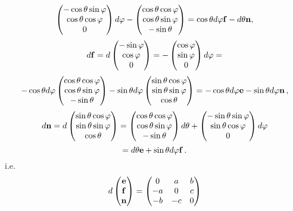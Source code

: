 \documentclass[12pt]{article}
\theoremstyle{theorem}
\numberwithin{equation}{section}
\begin{document}
{$$           $$
           $$
\begin{pmatrix}
        -\cos\theta\sin\varphi\cr
        \cos\theta\cos\varphi\cr
           0\cr
   \end{pmatrix}d\varphi-\begin{pmatrix}
        \cos\theta\cos\varphi\cr
        \cos\theta\sin\varphi\cr
        -\sin\theta\cr
   \end{pmatrix}=\cos\theta d\varphi {\bf f}-d\theta {\bf n},
            $$
             $$
            d{\bf f}=d
            \begin{pmatrix}
        -\sin\varphi\cr
        \cos\varphi\cr
          0\cr
   \end{pmatrix}=
              -
   \begin{pmatrix}
        \cos\varphi\cr
        \sin\varphi\cr
          0\cr
   \end{pmatrix}d\varphi=
            $$
            $$
       -\cos\theta d\varphi \begin{pmatrix}
        \cos\theta\cos\varphi\cr
        \cos\theta\sin\varphi\cr
        -\sin\theta\cr
   \end{pmatrix}-\sin\theta d\varphi
   \begin{pmatrix}
    \sin\theta\cos\varphi\cr
     \sin\theta\sin\varphi\cr
      \cos\theta\cr
   \end{pmatrix}=
   -\cos\theta d\varphi {\bf e}-\sin\theta d\varphi {\bf n}\,,
            $$
             $$
             d{\bf n}=
   d\begin{pmatrix}
    \sin\theta\cos\varphi\cr
     \sin\theta\sin\varphi\cr
      \cos\theta\cr
   \end{pmatrix}=
   \begin{pmatrix}
    \cos\theta\cos\varphi\cr
     \cos\theta\sin\varphi\cr
      -\sin\theta\cr
   \end{pmatrix}d\theta+
   \begin{pmatrix}
    -\sin\theta\sin\varphi\cr
     \sin\theta\cos\varphi\cr
        0\cr
   \end{pmatrix}d\varphi
        $$
        $$
   =d\theta {\bf e}+\sin\theta d\varphi {\bf f}\,.
        $$
   i.e.
   \begin{equation}\label{derivationformulaefor cylinder}
                    d\begin{pmatrix}
                    \e\cr\f\cr\n\cr
                    \end{pmatrix}=
                    \begin{pmatrix}
                    0&a&b\cr -a&0&c\cr -b&-c&0\cr
                    \end{pmatrix}

\end{equation}}
\end{document}

